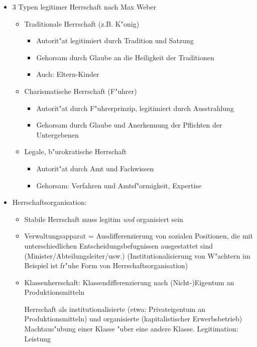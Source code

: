 \begin{itemize}
	\item
		3 Typen legitimer Herrschaft nach Max Weber
		\begin{itemize}
			\item
				Traditionale Herrschaft (z.B. K"onig)
				\begin{itemize}
					\item
						Autorit"at legitimiert durch Tradition und Satzung
					\item
						Gehorsam durch Glaube an die Heiligkeit der Traditionen
					\item
						Auch: Eltern-Kinder
				\end{itemize}
			\item
				Charismatische Herrschaft (F"uhrer)
				\begin{itemize}
					\item
						Autorit"at durch F"uhrerprinzip, legitimiert durch Ausstrahlung
					\item
						Gehorsam durch Glaube und Anerkennung der Pflichten der Untergebenen
				\end{itemize}
			\item
				Legale, b"urokratische Herrschaft
				\begin{itemize}
					\item
						Autorit"at durch Amt und Fachwissen
					\item
						Gehorsam: Verfahren und Amtsf"ormigkeit, Expertise
				\end{itemize}
		\end{itemize}
	\item
		Herrschaftsorganisation:
		\begin{itemize}
			\item
				Stabile Herrschaft muss legitim \textit{und} organisiert sein
			\item
				Verwaltungsapparat = Ausdifferenzierung von sozialen Positionen, die mit unterschiedlichen Entscheidungsbefugnissen ausgestattet sind (Minister/Abteilungsleiter/usw.) (Institutionalisierung von W"achtern im Beispiel ist fr"uhe Form von Herrschaftsorganisation)
			\item
				Klassenherrschaft: Klassendifferenzierung nach (Nicht-)Eigentum an Produktionsmitteln

				Herrschaft als institutionalisierte (etwa: Privateigentum an Produktionsmitteln) und organisierte (kapitalistischer Erwerbsbetrieb) Machtaus"ubung einer Klasse "uber eine andere Klasse. Legitimation: Leistung
		\end{itemize}
\end{itemize}


